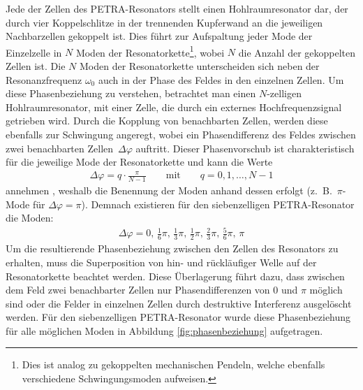 Jede der Zellen des PETRA-Resonators stellt einen Hohlraumresonator dar, der durch vier Koppelschlitze in der trennenden Kupferwand an die jeweiligen Nachbarzellen gekoppelt ist.
Dies führt zur Aufspaltung jeder Mode der Einzelzelle in $N$ Moden der Resonatorkette\footnote{Dies ist analog zu gekoppelten mechanischen Pendeln, welche ebenfalls verschiedene Schwingungsmoden aufweisen.}, wobei $N$ die Anzahl der gekoppelten Zellen ist.
Die $N$ Moden der Resonatorkette unterscheiden sich neben der Resonanzfrequenz $\omega_0$ auch in der Phase des Feldes in den einzelnen Zellen.
Um diese Phasenbeziehung zu verstehen, betrachtet man einen $N$-zelligen Hohlraumresonator, mit einer Zelle, die durch ein externes Hochfrequenzsignal getrieben wird.
Durch die Kopplung von benachbarten Zellen, werden diese ebenfalls zur Schwingung angeregt, wobei ein Phasendifferenz des Feldes zwischen zwei benachbarten Zellen~$\Delta \varphi$ auftritt.
Dieser Phasenvorschub ist charakteristisch für die jeweilige Mode der Resonatorkette und kann die Werte
\begin{align}
	\Delta \varphi = q \cdot \frac{\pi}{N-1} \qquad \text{mit} \qquad q = 0, 1, \dots, N-1
\end{align}
annehmen \cite[S.\ 110]{wangler}, weshalb die Benennung der Moden anhand dessen erfolgt (z.\ B.\ $\pi$-Mode für $\Delta \varphi = \pi$).
Demnach existieren für den siebenzelligen PETRA-Resonator die Moden:
\begin{align}
  \Delta \varphi = 0,\, \frac{1}{6} \pi,\, \frac{1}{3} \pi,\, \frac{1}{2} \pi,\, \frac{2}{3} \pi,\, \frac{5}{6} \pi,\, \pi
\end{align}
Um die resultierende Phasenbeziehung zwischen den Zellen des Resonators zu erhalten, muss die Superposition von hin- und rückläufiger Welle auf der Resonatorkette beachtet werden.
Diese Überlagerung führt dazu, dass zwischen dem Feld zwei benachbarter Zellen nur Phasendifferenzen von $0$ und $\pi$ möglich sind oder die Felder in einzelnen Zellen durch destruktive Interferenz ausgelöscht werden.
Für den siebenzelligen PETRA-Resonator wurde diese Phasenbeziehung für alle möglichen Moden in Abbildung \ref{fig:phasenbeziehung} aufgetragen.

